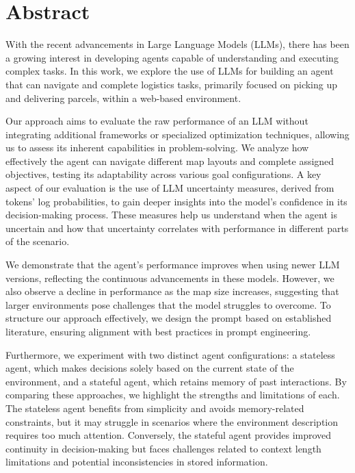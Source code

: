 \chapter*{Abstract}
\label{cha:abstract}

With the recent advancements in Large Language Models (LLMs), there has been a growing
interest in developing agents capable of understanding and executing complex tasks.
In this work, we explore the use of LLMs for building an agent that can navigate
and complete logistics tasks, primarily focused on picking up and delivering
parcels, within a web-based environment.

Our approach aims to evaluate the raw performance of an LLM without integrating additional
frameworks or specialized optimization techniques, allowing us to assess its
inherent capabilities in problem-solving. We analyze how effectively the agent can
navigate different map layouts and complete assigned objectives, testing its
adaptability across various goal configurations. A key aspect of our evaluation is
the use of LLM uncertainty measures, derived from tokens' log probabilities, to
gain deeper insights into the model's confidence in its decision-making process.
These measures help us understand when the agent is uncertain and how that uncertainty
correlates with performance in different parts of the scenario.

We demonstrate that the agent's performance improves when using newer LLM versions,
reflecting the continuous advancements in these models. However, we also observe
a decline in performance as the map size increases, suggesting that larger environments
pose challenges that the model struggles to overcome. To structure our approach
effectively, we design the prompt based on established literature, ensuring
alignment with best practices in prompt engineering.

Furthermore, we experiment with two distinct agent configurations: a stateless
agent, which makes decisions solely based on the current state of the environment,
and a stateful agent, which retains memory of past interactions. By comparing
these approaches, we highlight the strengths and limitations of each. The
stateless agent benefits from simplicity and avoids memory-related constraints, but
it may struggle in scenarios where the environment description requires too much
attention. Conversely, the stateful agent provides improved continuity in decision-making
but faces challenges related to context length limitations and potential inconsistencies
in stored information.